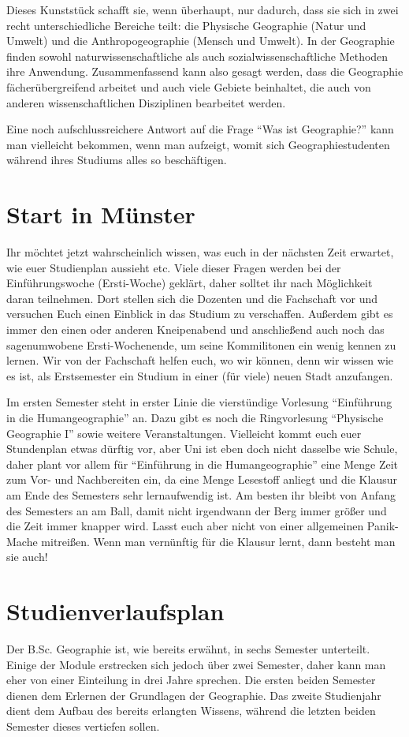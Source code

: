 Dieses Kunststück schafft sie, wenn überhaupt, nur dadurch, dass sie sich in zwei recht unterschiedliche Bereiche teilt: die Physische Geographie (Natur und Umwelt) und die Anthropogeographie (Mensch und Umwelt). In der Geographie ﬁnden sowohl naturwissenschaftliche als auch sozialwissenschaftliche Methoden ihre Anwendung. Zusammenfassend kann also gesagt werden, dass die Geographie fächerübergreifend arbeitet und auch viele Gebiete beinhaltet, die auch von anderen wissenschaftlichen Disziplinen bearbeitet werden.

Eine noch aufschlussreichere Antwort auf die Frage \enquote{Was ist Geographie?} kann man vielleicht bekommen, wenn man aufzeigt, womit sich Geographiestudenten während ihres Studiums alles so beschäftigen.

\section*{Start in Münster}
Ihr möchtet jetzt wahrscheinlich wissen, was euch in der nächsten Zeit erwartet, wie euer Studienplan aussieht etc. Viele dieser Fragen werden bei der Einführungswoche (Ersti-Woche) geklärt, daher solltet ihr nach Möglichkeit daran teilnehmen. Dort stellen sich die Dozenten und die Fachschaft vor und versuchen Euch einen Einblick in das Studium zu verschaffen. Außerdem gibt es immer den einen oder anderen Kneipenabend und anschließend auch noch das sagenumwobene Ersti-Wochenende, um seine Kommilitonen ein wenig kennen zu lernen. Wir von der Fachschaft helfen euch, wo wir können, denn wir wissen wie es ist, als Erstsemester ein Studium in einer (für viele) neuen Stadt anzufangen.

Im ersten Semester steht in erster Linie die vierstündige Vorlesung \enquote{Einführung in die Humangeographie} an. Dazu gibt es noch die Ringvorlesung \enquote{Physische Geographie I} sowie weitere Veranstaltungen. Vielleicht kommt euch euer Stundenplan etwas dürftig vor, aber Uni ist eben doch nicht dasselbe wie Schule, daher plant vor allem für \enquote{Einführung in die Humangeographie} eine Menge Zeit zum Vor- und Nachbereiten ein, da eine Menge Lesestoff anliegt und die Klausur am Ende des Semesters sehr lernaufwendig ist. Am besten ihr bleibt von Anfang des Semesters an am Ball, damit nicht irgendwann der Berg immer größer und die Zeit immer knapper wird. Lasst euch aber nicht von einer allgemeinen Panik-Mache mitreißen. Wenn man vernünftig für die Klausur lernt, dann besteht man sie auch!

\section{Studienverlaufsplan}
Der B.Sc. Geographie ist, wie bereits erwähnt, in sechs Semester unterteilt. Einige der Module erstrecken sich jedoch über zwei Semester, daher kann man eher von einer Einteilung in drei Jahre sprechen. Die ersten beiden Semester dienen dem Erlernen der Grundlagen der Geographie. Das zweite Studienjahr dient dem Aufbau des bereits erlangten Wissens, während die letzten beiden Semester dieses vertiefen sollen.

